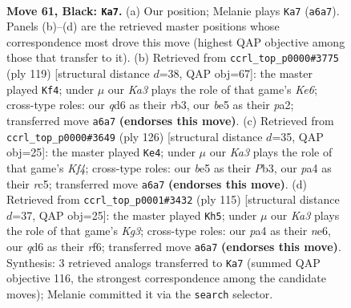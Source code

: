 \documentclass[11pt]{article}
\begin{document}
\clearpage

\begin{figure}[p]\centering
\begin{subfigure}{0.46\textwidth}\centering
\resizebox{\linewidth}{!}{%
\newchessgame
\chessboard[
  setfen={8/8/k2Q4/p2pBp2/P6r/8/8/RN4K1 b - - 3 61},
  showmover=false,
  pgfstyle=straightmove, color=movearrow, markmove={a6-a7}
]}
\caption{}
\end{subfigure}\hfill
\begin{subfigure}{0.46\textwidth}\centering
\resizebox{\linewidth}{!}{%
\newchessgame
\chessboard[
  setfen={8/8/p7/3P1p2/3r4/1R2k3/PP4Bp/7K b - - 2 60},
  showmover=false,
  pgfstyle=straightmove, color=movearrow, markmove={e3-f4}
]}
\caption{}
\end{subfigure}
\\[4pt]
\begin{subfigure}{0.46\textwidth}\centering
\resizebox{\linewidth}{!}{%
\newchessgame
\chessboard[
  setfen={3k2B1/R5p1/8/2r1b3/1p3K2/1P4P1/8/8 w - - 18 64},
  showmover=false,
  pgfstyle=straightmove, color=movearrow, markmove={f4-e4}
]}
\caption{}
\end{subfigure}\hfill
\begin{subfigure}{0.46\textwidth}\centering
\resizebox{\linewidth}{!}{%
\newchessgame
\chessboard[
  setfen={8/pp6/4NRk1/3bB1p1/8/P6r/1P1K4/8 b - - 9 58},
  showmover=false,
  pgfstyle=straightmove, color=movearrow, markmove={g6-h5}
]}
\caption{}
\end{subfigure}
\caption{\textbf{Move 61, Black: \texttt{Ka7}.} (a) Our position; Melanie plays \texttt{Ka7} (\texttt{a6a7}). Panels (b)--(d) are the retrieved master positions whose correspondence most drove this move (highest QAP objective among those that transfer to it). (b) Retrieved from \texttt{ccrl\_top\_p0000\#3775} (ply 119) [structural distance $d$=38, QAP obj=67]: the master played \texttt{Kf4}; under $\mu$ our \emph{Ka3} plays the role of that game's \emph{Ke6}; cross-type roles: our \emph{q}d6 as their \emph{r}b3, our \emph{b}e5 as their \emph{p}a2; transferred move \texttt{a6a7} \textbf{(endorses this move)}. (c) Retrieved from \texttt{ccrl\_top\_p0000\#3649} (ply 126) [structural distance $d$=35, QAP obj=25]: the master played \texttt{Ke4}; under $\mu$ our \emph{Ka3} plays the role of that game's \emph{Kf4}; cross-type roles: our \emph{b}e5 as their \emph{P}b3, our \emph{p}a4 as their \emph{r}c5; transferred move \texttt{a6a7} \textbf{(endorses this move)}. (d) Retrieved from \texttt{ccrl\_top\_p0001\#3432} (ply 115) [structural distance $d$=37, QAP obj=25]: the master played \texttt{Kh5}; under $\mu$ our \emph{Ka3} plays the role of that game's \emph{Kg3}; cross-type roles: our \emph{p}a4 as their \emph{n}e6, our \emph{q}d6 as their \emph{r}f6; transferred move \texttt{a6a7} \textbf{(endorses this move)}. Synthesis: 3 retrieved analogs transferred to \texttt{Ka7} (summed QAP objective 116, the strongest correspondence among the candidate moves); Melanie committed it via the \texttt{search} selector.}
\label{fig:thought-m121}
\end{figure}
\end{document}
